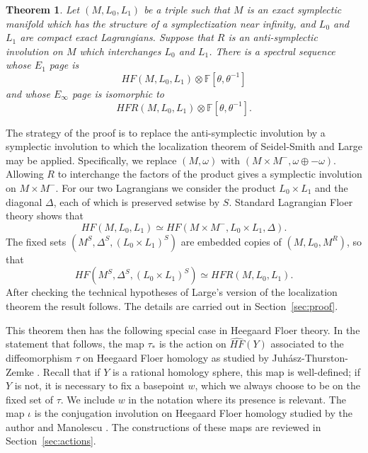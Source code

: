 \documentclass[11pt,reqno]{amsart}
\newtheorem{thm}{Theorem}[section]
\theoremstyle{definition}
\theoremstyle{remark}
\newcommand{\bF}{\mathbb{F}}
\newcommand{\HF}{\mathit{HF}}
\newcommand{\HFR}{\mathit{HFR}}
\newcommand\HFhat{\widehat{\HF}}
\numberwithin{equation}{section}
\begin{document}
\begin{thm} \label{thm:main} Let $(M, L_0, L_1)$ be a triple such that $M$ is an exact symplectic manifold which has the structure of a symplectization near infinity, and $L_0$ and $L_1$ are compact exact Lagrangians. Suppose that $R$ is an anti-symplectic involution on $M$ which interchanges $L_0$ and $L_1$. There is a spectral sequence whose $E_1$ page is
%
\[HF(M,L_0,L_1) \otimes \bF[\theta, \theta^{-1}]\]
%
and whose $E_{\infty}$ page is isomorphic to
%
\[ \HFR(M, L_0, L_1) \otimes \bF[\theta, \theta^{-1}].\]
\end{thm}
%
The strategy of the proof is to replace the anti-symplectic involution by a symplectic involution to which the localization theorem of Seidel-Smith and Large may be applied. Specifically, we replace $(M, \omega)$ with $(M \times M^-, \omega\oplus -\omega)$. Allowing $R$ to interchange the factors of the product gives a symplectic involution on $M \times M^-$. For our two Lagrangians we consider the product $L_0 \times L_1$ and the diagonal $\Delta$, each of which is preserved setwise by $S$. Standard Lagrangian Floer theory shows that \[\HF(M, L_0, L_1) \simeq \HF(M \times M^-, L_0\times L_1, \Delta).\] The fixed sets $(M^S, \Delta^S, (L_0 \times L_1)^S)$ are embedded copies of $(M, L_0, M^R)$, so that \[\HF(M^S, \Delta^S, (L_0 \times L_1)^S) \simeq \HFR(M, L_0, L_1).\] After checking the technical hypotheses of Large's version of the localization theorem the result follows. The details are carried out in Section~\ref{sec:proof}.

This theorem then has the following special case in Heegaard Floer theory. In the statement that follows, the map $\tau_*$ is the action on $\HFhat(Y)$ associated to the diffeomorphism $\tau$ on Heegaard Floer homology as studied by Juh{\'a}sz-Thurston-Zemke \cite{JTNaturality}. Recall that if $Y$ is a rational homology sphere, this map is well-defined; if $Y$ is not, it is necessary to fix a basepoint $w$, which we always choose to be on the fixed set of $\tau$. We include $w$ in the notation where its presence is relevant. The map $\iota$ is the conjugation involution on Heegaard Floer homology studied by the author and Manolescu \cite{HMInvolutive}. The constructions of these maps are reviewed in Section~\ref{sec:actions}.
\end{document}
